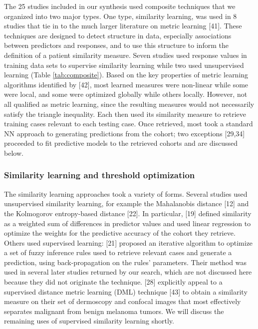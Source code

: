 \documentclass[preprint, 3p,
authoryear]{elsarticle} %
\begin{document}
The 25 studies included in our synthesis used composite techniques that
we organized into two major types. One type, similarity learning, was
used in 8 studies that tie in to the much larger literature on metric
learning {[}41{]}. These techniques are designed to detect structure in
data, especially associations between predictors and responses, and to
use this structure to inform the definition of a patient similarity
measure. Seven studies used response values in training data sets to
supervise similarity learning while two used unsupervised learning
(Table \ref{tab:composite}). Based on the key properties of metric
learning algorithms identified by {[}42{]}, most learned measures were
non-linear while some were local, and some were optimized globally while
others locally. However, not all qualified as metric learning, since the
resulting measures would not necessarily satisfy the triangle
inequality. Each then used its similarity measure to retrieve training
cases relevant to each testing case. Once retrieved, most took a
standard NN approach to generating predictions from the cohort; two
exceptions {[}29,34{]} proceeded to fit predictive models to the
retrieved cohorts and are discussed below.

\hypertarget{similarity-learning-and-threshold-optimization}{%
\subsubsection{Similarity learning and threshold
optimization}\label{similarity-learning-and-threshold-optimization}}

The similarity learning approaches took a variety of forms. Several
studies used unsupervised similarity learning, for example the
Mahalanobis distance {[}12{]} and the Kolmogorov entropy-based distance
{[}22{]}. In particular, {[}19{]} defined similarity as a weighted sum
of differences in predictor values and used linear regression to
optimize the weights for the predictive accuracy of the cohort they
retrieve. Others used supervised learning: {[}21{]} proposed an
iterative algorithm to optimize a set of fuzzy inference rules used to
retrieve relevant cases and generate a prediction, using
back-propagation on the rules' parameters. Their method was used in
several later studies returned by our search, which are not discussed
here because they did not originate the technique. {[}28{]} explicitly
appeal to a supervised distance metric learning (DML) technique {[}43{]}
to obtain a similarity measure on their set of dermoscopy and confocal
images that most effectively separates malignant from benign melanoma
tumors. We will discuss the remaining uses of supervised similarity
learning shortly.
\end{document}

